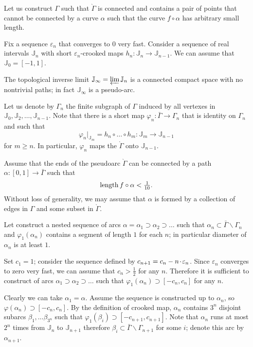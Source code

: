 \documentclass[oneside,a4paper]{article}
\def\JJ{\mathbb{J}}
\def\eps{\varepsilon}
\def\phi{\varphi}
\def\ge{\geqslant}
\def\:{\colon}
\def\length{\mathop{\rm length}\nolimits}
\newcommand*{\z}[1]{#1\nobreak\discretionary{}%
            {\hbox{$\mathsurround=0pt #1$}}{}}
\let\oldcdot\cdot
\def\cdot{{\hskip0.5pt\z\oldcdot\hskip0.5pt}}
\begin{document}
Let us construct $\Gamma$  such that $\grave\Gamma$ is connected and contains a pair of points that cannot be connected by a curve $\alpha$ such that the curve $f\circ\alpha$ has arbitrary small length. 

Fix a sequence $\eps_n$ that converges to $0$ very fast.
Consider a sequence of real intervals $\JJ_n$ with short $\eps_n$-crooked maps $h_n\:\JJ_{n}\to \JJ_{n-1}$.
We can assume that $\JJ_0=[-1,1]$.

The topological inverse limit $\JJ_\infty=\varprojlim \JJ_n$ is a connected compact space with no nontrivial paths; in fact $\JJ_\infty$ is a pseudo-arc.

Let us denote by $\Gamma_n$ the finite subgraph of $\Gamma$ induced by all vertexes in $\JJ_0,\JJ_2,\dots,\JJ_{n-1}$.
Note that there is a short map $\phi_n\:\bar\Gamma\to\Gamma_{n}$ that is identity on $\Gamma_{n}$ and such that
\[\phi_n|_{\JJ_m}=h_n\circ\dots\circ h_{m}\:\JJ_m\to\JJ_{n-1}\] 
for $m\ge n$.
In particular, $\phi_n$ maps the $\grave\Gamma$ onto $\JJ_{n-1}$.

Assume that the ends of the pseudoarc $\grave\Gamma$ can be connected by a path $\alpha\:[0,1]\to\bar\Gamma$ such that 
\[\length f\circ\alpha<\tfrac1{10}.\]
Without loss of generality, we may assume that $\alpha$ is formed by a collection of edges in $\Gamma$ and some subset in $\grave\Gamma$.

Let construct a nested sequence of arcs $\alpha=\alpha_1\supset \alpha_2\supset \dots$ such that $\alpha_n\subset \bar\Gamma\backslash\Gamma_n$ and $\phi_1(\alpha_n)$ contains a segment of length $1$ for each $n$;
in particular diameter of $\alpha_n$ is at least $1$.

Set $c_1=1$; consider the sequence defined by $c_{n+1}=c_n-n\cdot \eps_n$.
Since $\eps_n$ converges to zero very fast, we can assume that $c_n>\tfrac12$ for any $n$.
Therefore it is sufficient to construct  of arcs $\alpha_1\supset \alpha_2\supset \dots$ such that $\phi_1(\alpha_n)\supset [-c_n,c_n]$ for any $n$.

Clearly we can take $\alpha_1=\alpha$.
Assume the sequence is constructed up to $\alpha_n$, so $\phi(\alpha_n)\supset [-c_n,c_n]$.
By the definition of crooked map,
$\alpha_n$ contains $3^n$ disjoint subarcs $\beta_1,\dots \beta_{3^n}$ such that $\phi_1(\beta_i)\supset [-c_{n+1},c_{n+1}]$.
Note that $\alpha_n$ runs at most $2^n$ times from $\JJ_n$ to $\JJ_{n+1}$ therefore $\beta_i\subset \bar\Gamma\backslash\Gamma_{n+1}$ for some $i$; denote this arc by $\alpha_{n+1}$.
\end{document}
